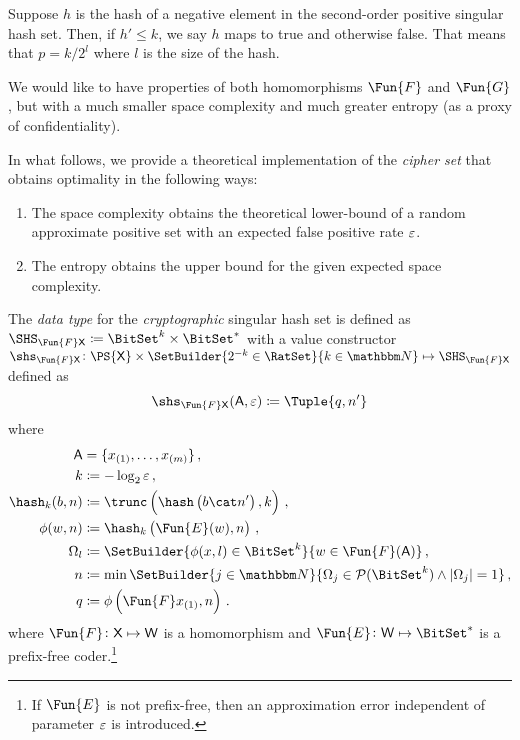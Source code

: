 \documentclass[ ../main.tex]{subfiles}
\begin{document}
Suppose $h$ is the hash of a negative element in the second-order positive singular hash set.
Then, if $h' \leq k$, we say $h$ maps to true and otherwise false.
That means that $p = k / 2^l$ where $l$ is the size of the hash.

We would like to have properties of both homomorphisms $\Fun{F}$ and $\Fun{G}$, but with a much smaller space complexity and much greater entropy (as a proxy of confidentiality).

In what follows, we provide a theoretical implementation of the \emph{cipher set} that obtains optimality in the following ways:
\begin{enumerate}
	\item The space complexity obtains the theoretical lower-bound of a random approximate positive set with an expected false positive rate $\varepsilon$.
	\item The entropy obtains the upper bound for the given expected space complexity.
\end{enumerate}

\begin{definition}
\label{alg:makeset}
	The \emph{data type} for the \emph{cryptographic} singular hash set is defined as $\SHS_{\Fun{F} \Set{X}} \coloneqq \BitSet^k \times \BitSet^*$ with a value constructor $\shs_{\Fun{F}\Set{X}} \colon \PS{\Set{X}} \times \SetBuilder{2^{-k} \in \RatSet}{k \in \NatSet} \mapsto \SHS_{\Fun{F} \Set{X}}$ defined as
	\begin{equation}
	\shs_{\Fun{F} \Set{X}}(\Set{A}, \fprate) \coloneqq \Tuple{q,n'}
	\end{equation}
	where
	\begin{equation}
	\begin{split}
	\Set{A}     & = \{x_{(1)},\ldots,x_{(m)}\}\,,\\
	k			& \coloneqq -\log_2 \fprate\,,\\
	\hash_k(b,n)& \coloneqq \trunc\left(\hash\left(b \cat n'\right),k\right)\,,\\	
	\phi(w,n) 	& \coloneqq \hash_k\left(\Fun{E}(w), n\right)\,,\\
	\Omega_l 	& \coloneqq \SetBuilder{\phi(x,l) \in \BitSet^k}{w \in \Fun{F}(\Set{A})}\,,\\
	n 			& \coloneqq \min\SetBuilder{ j \in \NatSet }{ \Omega_j \in \PowerSet(\BitSet^k) \land \Card{\Omega_j} = 1}\,,\\
	q 			& \coloneqq \phi\left(\Fun{F} x_{(1)},n\right)\,.
	\end{split}
	\end{equation}
where $\Fun{F} \colon \Set{X} \mapsto \Set{W}$ is a homomorphism and $\Fun{E} \colon \Set{W} \mapsto \BitSet^*$ is a prefix-free coder.\footnote{If $\Fun{E}$ is not prefix-free, then an approximation error independent of parameter $\varepsilon$ is introduced.}
\end{definition}
\end{document}
